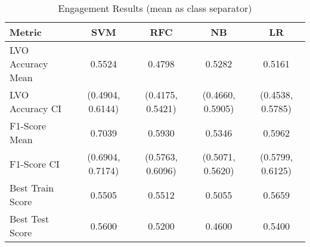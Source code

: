 \begin{table}[h!]
\centering
\begin{tabular}{|l|c|c|c|c|}
\hline
\textbf{Metric}           & \textbf{SVM}    & \textbf{RFC}    & \textbf{NB}     & \textbf{LR}     \\ \hline
LVO Accuracy Mean         & 0.5524          & 0.4798          & 0.5282          & 0.5161          \\ \hline
LVO Accuracy CI           & (0.4904, 0.6144)& (0.4175, 0.5421)& (0.4660, 0.5905)& (0.4538, 0.5785)\\ \hline
F1-Score Mean             & 0.7039          & 0.5930          & 0.5346          & 0.5962          \\ \hline
F1-Score CI               & (0.6904, 0.7174)& (0.5763, 0.6096)& (0.5071, 0.5620)& (0.5799, 0.6125)\\ \hline
Best Train Score          & 0.5505          & 0.5512          & 0.5055          & 0.5659          \\ \hline
Best Test Score           & 0.5600          & 0.5200          & 0.4600          & 0.5400          \\ \hline
\end{tabular}
\caption{Engagement Results (mean as class separator)}
\label{table:engagement}
\end{table}
